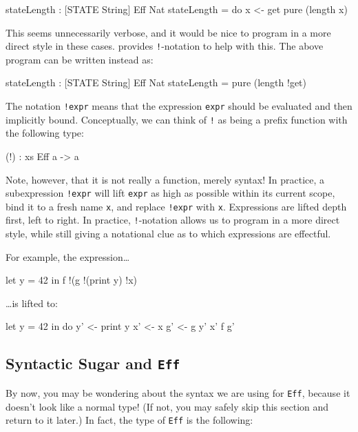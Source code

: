 \begin{code}
stateLength : { [STATE String] } Eff Nat
stateLength = do x <- get
                 pure (length x)
\end{code}

\noindent
This seems unnecessarily verbose, and it would be nice to program in a more
direct style in these cases. \Idris{} provides \texttt{!}-notation to help
with this. The above program can be written instead as:

\begin{code}
stateLength : { [STATE String] } Eff Nat
stateLength = pure (length !get)
\end{code}

\noindent
The notation \texttt{!expr} means that the expression \texttt{expr} should
be evaluated and then implicitly bound. Conceptually,
we can think of \texttt{!} as being a prefix function with the following type:

\begin{code}
(!) : { xs } Eff a -> a
\end{code}

\noindent
Note, however, that it is not really a function, merely syntax! In practice, a
subexpression \texttt{!expr} will lift \texttt{expr} as high as possible within
its current scope, bind it to a fresh name \texttt{x}, and replace
\texttt{!expr} with \texttt{x}. Expressions are lifted depth first, left to
right. In practice, \texttt{!}-notation allows us to program in a more direct
style, while still giving a notational clue as to which expressions are
effectful.

For example, the expression\ldots

\begin{code}
let y = 42 in f !(g !(print y) !x) 
\end{code}

\ldots is lifted to:

\begin{code}
let y = 42 in do y' <- print y
                 x' <- x
                 g' <- g y' x'
                 f g'
\end{code}


\subsection{Syntactic Sugar and \texttt{Eff}}

By now, you may be wondering about the syntax we are using for \texttt{Eff},
because it doesn't look like a normal \Idris{} type! (If not, you may
safely skip this section and return to it later.) In fact, the type of
\texttt{Eff} is the following:

